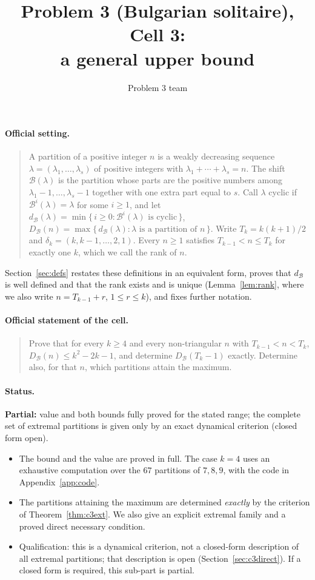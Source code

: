 \documentclass[11pt]{article}
\author{Problem 3 team}
\title{Problem 3 (Bulgarian solitaire), Cell 3:\\ a general upper bound}
\date{}
\theoremstyle{definition}
\newcommand{\B}{\mathcal{B}}
\newcommand{\dB}{d_{\mathcal{B}}}
\newcommand{\DB}{D_{\mathcal{B}}}
\renewcommand{\le}{\leqslant}
\renewcommand{\ge}{\geqslant}
\begin{document}
\maketitle

\paragraph{Official setting.}
\begin{quote}
A partition of a positive integer $n$ is a weakly decreasing sequence $\lambda=(\lambda_1,\dots,\lambda_s)$ of
positive integers with $\lambda_1+\cdots+\lambda_s=n$.  The shift $\B(\lambda)$ is the partition whose parts are the
positive numbers among $\lambda_1-1,\dots,\lambda_s-1$ together with one extra part equal to $s$.  Call $\lambda$
cyclic if $\B^i(\lambda)=\lambda$ for some $i\ge1$, and let $\dB(\lambda)=\min\{\,i\ge0:\B^i(\lambda)\text{ is cyclic}\,\}$,
$\DB(n)=\max\{\,\dB(\lambda):\lambda\text{ is a partition of }n\,\}$.  Write $T_k=k(k+1)/2$ and
$\delta_k=(k,k-1,\dots,2,1)$.  Every $n\ge1$ satisfies $T_{k-1}<n\le T_k$ for exactly one $k$, which we call the
rank of $n$.
\end{quote}
Section~\ref{sec:defs} restates these definitions in an equivalent form, proves that $\dB$ is well defined and
that the rank exists and is unique (Lemma~\ref{lem:rank}, where we also write $n=T_{k-1}+r$, $1\le r\le k$), and
fixes further notation.

\paragraph{Official statement of the cell.}
\begin{quote}
Prove that for every $k\ge4$ and every non-triangular $n$ with $T_{k-1}<n<T_k$, $\DB(n)\le k^2-2k-1$, and
determine $\DB(T_k-1)$ exactly.  Determine also, for that $n$, which partitions attain the maximum.
\end{quote}

\paragraph{Status.} \textbf{Partial:} value and both bounds fully proved for the stated range; the complete set of extremal partitions is given only by an exact dynamical criterion (closed form open).
\begin{itemize}
\item The bound and the value are proved in full.  The case $k=4$ uses an exhaustive computation over the $67$
partitions of $7,8,9$, with the code in Appendix~\ref{app:code}.
\item The partitions attaining the maximum are determined \emph{exactly} by the criterion of
Theorem~\ref{thm:c3ext}.  We also give an explicit extremal family and a proved direct necessary condition.
\item Qualification: this is a dynamical criterion, not a closed-form description of all extremal partitions;
that description is open (Section~\ref{sec:c3direct}).  If a closed form is required, this sub-part is partial.
\end{itemize}
\end{document}

